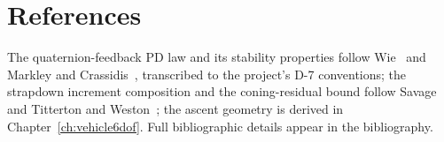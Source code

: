 \section{References}
\label{sec:gnc:references}

The quaternion-feedback PD law and its stability properties follow
Wie~\cite{wie2008} and Markley and Crassidis~\cite{markley2014},
transcribed to the project's D-7 conventions; the strapdown increment
composition and the coning-residual bound follow
Savage~\cite{savage1998a} and Titterton and
Weston~\cite{titterton2004}; the ascent geometry is derived in
Chapter~\ref{ch:vehicle6dof}. Full bibliographic details appear in the
bibliography.
